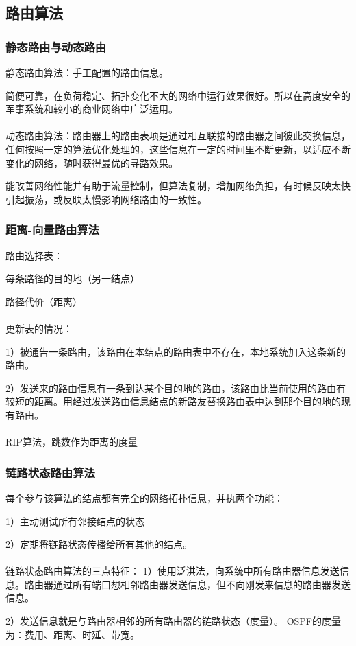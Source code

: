\documentclass{ctexart}
\begin{document}
\subsection{路由算法}
\subsubsection{静态路由与动态路由}
静态路由算法：手工配置的路由信息。

简便可靠，在负荷稳定、拓扑变化不大的网络中运行效果很好。所以在高度安全的军事系统和较小的商业网络中广泛运用。
\\\\
动态路由算法：路由器上的路由表项是通过相互联接的路由器之间彼此交换信息，任何按照一定的算法优化处理的，这些信息在一定的时间里不断更新，以适应不断变化的网络，随时获得最优的寻路效果。

能改善网络性能并有助于流量控制，但算法复制，增加网络负担，有时候反映太快引起振荡，或反映太慢影响网络路由的一致性。
\subsubsection{距离-向量路由算法}
路由选择表：

每条路径的目的地（另一结点）

路径代价（距离）
\\\\
更新表的情况：

1）被通告一条路由，该路由在本结点的路由表中不存在，本地系统加入这条新的路由。

2）发送来的路由信息有一条到达某个目的地的路由，该路由比当前使用的路由有较短的距离。用经过发送路由信息结点的新路友替换路由表中达到那个目的地的现有路由。
\\\\
RIP算法，跳数作为距离的度量

\subsubsection{链路状态路由算法}
每个参与该算法的结点都有完全的网络拓扑信息，并执两个功能：

1）主动测试所有邻接结点的状态

2）定期将链路状态传播给所有其他的结点。
\\\\
链路状态路由算法的三点特征：
1）使用泛洪法，向系统中所有路由器信息发送信息。路由器通过所有端口想相邻路由器发送信息，但不向刚发来信息的路由器发送信息。

2）发送信息就是与路由器相邻的所有路由器的链路状态（度量）。
OSPF的度量为：费用、距离、时延、带宽。
\end{document}
